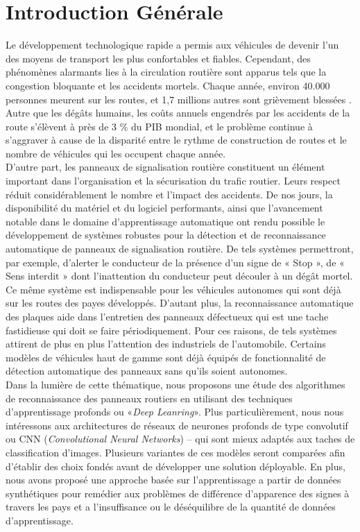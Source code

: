 \chapter*{Introduction Générale}
\label{chap:introduction}

Le développement technologique rapide a permis aux véhicules de devenir l’un des moyens de transport les plus confortables et fiables. Cependant, des phénomènes alarmants lies à la circulation routière sont apparus tels que la congestion bloquante et les accidents mortels. Chaque année, environ 40.000 personnes meurent sur les routes, et 1,7 millions autres sont grièvement blessées \cite{25}. Autre que les dégâts humains, les coûts annuels engendrés par les accidents de la route s’élèvent à près de 3 \% du PIB mondial, et le problème continue à s’aggraver à cause de la disparité entre le rythme de construction de routes et le nombre de véhicules qui les occupent chaque année. \\

D'autre part, les panneaux de signalisation routière constituent un élément important dans l’organisation et la sécurisation du trafic routier. Leurs respect réduit considérablement le nombre et l’impact des accidents. De nos jours, la disponibilité du matériel et du logiciel performants, ainsi que l’avancement notable dans le domaine d’apprentissage automatique ont rendu possible le développement de systèmes robustes pour la détection et de reconnaissance automatique de panneaux de signalisation routière.  De tels systèmes permettront, par exemple, d’alerter le conducteur de la présence d’un signe de « Stop », de « Sens interdit » dont l’inattention du conducteur peut découler à un dégât mortel. Ce même système est indispensable pour les véhicules autonomes qui sont déjà sur les routes des payes développés. D’autant plus, la reconnaissance automatique des plaques aide dans l’entretien des panneaux défectueux qui est une tache fastidieuse qui doit se faire périodiquement. Pour ces raisons, de tels systèmes attirent de plus en plus l’attention des industriels de l’automobile. Certains modèles de véhicules haut de gamme sont déjà équipés de fonctionnalité de détection automatique des panneaux sans qu’ils soient autonomes. \\

Dans la lumière de cette thématique, nous proposons une étude des algorithmes de reconnaissance des panneaux routiers en utilisant des techniques d’apprentissage profonds ou «\textit{Deep Leanring}». Plus particulièrement, nous nous intéressons aux architectures de réseaux de neurones profonds de type convolutif ou CNN (\textit{Convolutional Neural Networks}) – qui sont mieux adaptés aux taches de classification d’images. Plusieurs variantes de ces modèles seront comparées afin d’établir des choix fondés avant de développer une solution déployable. En plus, nous avons proposé une approche basée sur l’apprentissage a partir de données synthétiques pour remédier aux problèmes de différence d'apparence des signes à travers les pays et a l’insuffisance ou le déséquilibre de la quantité de données d’apprentissage.\\
 
